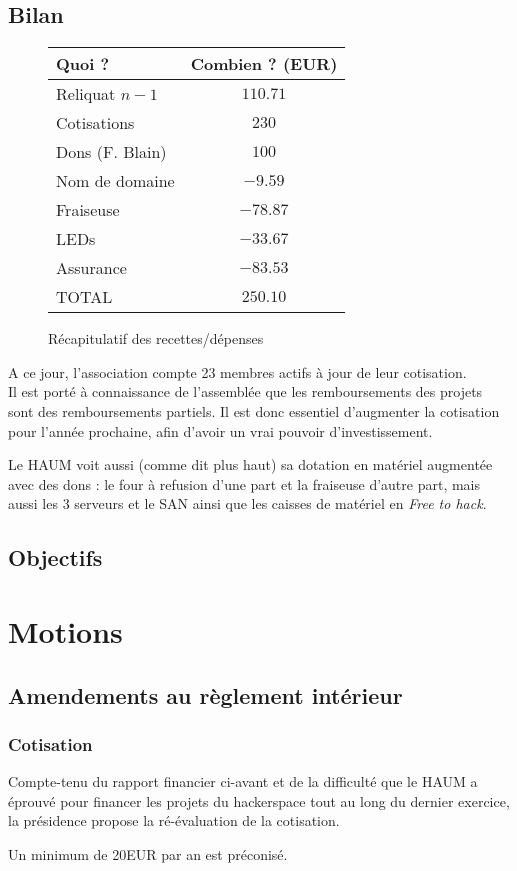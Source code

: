 \documentclass[11pt]{article}
\begin{document}
\subsection{Bilan}

\begin{figure}[h]
\centering
\begin{tabular}{l|c}
Quoi ? & Combien ? (EUR)  \\\hline
Reliquat $n-1$ & $110.71$\\
Cotisations & $230$ \\
Dons (F. Blain) & $100$ \\
Nom de domaine & $-9.59$\\
Fraiseuse & $-78.87$\\
LEDs & $-33.67$\\
Assurance & $-83.53$\\\hline\hline
TOTAL & $250.10$\\
\end{tabular}
\caption{Récapitulatif des recettes/dépenses}
\end{figure}

A ce jour, l'association compte 23 membres actifs à jour de leur cotisation. \\

Il est porté à connaissance de l'assemblée que les remboursements des projets sont des remboursements partiels. Il est donc essentiel d'augmenter la cotisation pour l'année prochaine, afin d'avoir un vrai pouvoir d'investissement.

Le HAUM voit aussi (comme dit plus haut) sa dotation en matériel augmentée avec des dons : le four à refusion d'une part
et la fraiseuse d'autre part, mais aussi les 3 serveurs et le SAN ainsi que les caisses de matériel en \textit{Free to
hack}.

\subsection{Objectifs}


\section{Motions}

\subsection{Amendements au règlement intérieur}

\subsubsection{Cotisation}

Compte-tenu du rapport financier ci-avant et de la difficulté que le HAUM a éprouvé pour financer les projets du hackerspace tout au long du dernier exercice, la présidence propose la ré-évaluation de la cotisation.

Un minimum de 20EUR par an est préconisé.
\end{document}
